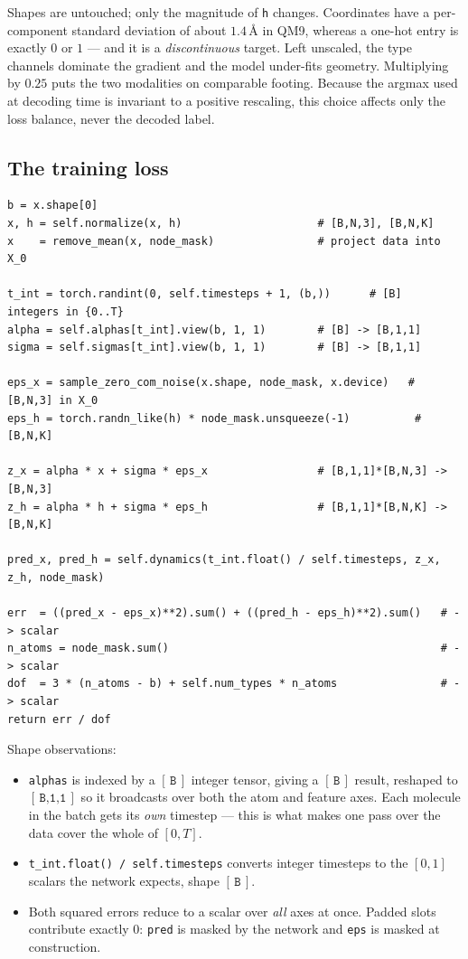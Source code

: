 \documentclass[11pt,a4paper]{article}
\newcommand{\shape}[1]{\ensuremath{[\,\texttt{#1}\,]}}
\newcommand{\code}[1]{\texttt{#1}}
\begin{document}
\noindent
Shapes are untouched; only the magnitude of \code{h} changes. Coordinates have a
per-component standard deviation of about $1.4$\,\r{A} in QM9, whereas a one-hot
entry is exactly $0$ or $1$ --- and it is a \emph{discontinuous} target. Left
unscaled, the type channels dominate the gradient and the model under-fits
geometry. Multiplying by $0.25$ puts the two modalities on comparable footing.
Because the argmax used at decoding time is invariant to a positive rescaling,
this choice affects only the loss balance, never the decoded label.

\subsection{The training loss}

\begin{lstlisting}[caption={\code{EquivariantDiffusion.loss}}]
b = x.shape[0]
x, h = self.normalize(x, h)                     # [B,N,3], [B,N,K]
x    = remove_mean(x, node_mask)                # project data into X_0

t_int = torch.randint(0, self.timesteps + 1, (b,))      # [B]  integers in {0..T}
alpha = self.alphas[t_int].view(b, 1, 1)        # [B] -> [B,1,1]
sigma = self.sigmas[t_int].view(b, 1, 1)        # [B] -> [B,1,1]

eps_x = sample_zero_com_noise(x.shape, node_mask, x.device)   # [B,N,3] in X_0
eps_h = torch.randn_like(h) * node_mask.unsqueeze(-1)          # [B,N,K]

z_x = alpha * x + sigma * eps_x                 # [B,1,1]*[B,N,3] -> [B,N,3]
z_h = alpha * h + sigma * eps_h                 # [B,1,1]*[B,N,K] -> [B,N,K]

pred_x, pred_h = self.dynamics(t_int.float() / self.timesteps, z_x, z_h, node_mask)

err  = ((pred_x - eps_x)**2).sum() + ((pred_h - eps_h)**2).sum()   # -> scalar
n_atoms = node_mask.sum()                                          # -> scalar
dof  = 3 * (n_atoms - b) + self.num_types * n_atoms                # -> scalar
return err / dof
\end{lstlisting}

\noindent
Shape observations:
\begin{itemize}[leftmargin=1.4em]
\item \code{alphas} is indexed by a \shape{B} integer tensor, giving a \shape{B}
      result, reshaped to \shape{B,1,1} so it broadcasts over both the atom and
      feature axes. Each molecule in the batch gets its \emph{own} timestep ---
      this is what makes one pass over the data cover the whole of $[0,T]$.
\item \code{t\_int.float() / self.timesteps} converts integer timesteps to the $[0,1]$
      scalars the network expects, shape \shape{B}.
\item Both squared errors reduce to a scalar over \emph{all} axes at once. Padded
      slots contribute exactly $0$: \code{pred} is masked by the network and
      \code{eps} is masked at construction.
\end{itemize}
\end{document}
